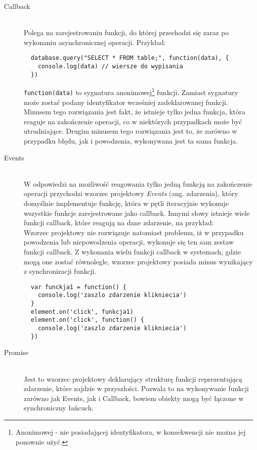 \begin{description}
  \item[Callback] \hfill \\
  Polega na zarejestrowaniu funkcji, do której przechodzi się zaraz po wykonaniu asynchronicznej operacji. Przykład:
  \lstset{language=Octave}
  \begin{lstlisting}
  database.query("SELECT * FROM table;", function(data), {
  	console.log(data) // wiersze do wypisania
  })
  \end{lstlisting}
  \lstinline{function(data)} to sygnatura anonimowej\footnote{Anonimowej - nie posiadającej identyfikatora, w konsekwencji nie można jej ponownie użyć.} funkcji. Zamiast sygnatury może zostać podany identyfikator wcześniej zadeklarowanej funkcji. Minusem tego rozwiązania jest fakt, że istnieje tylko jedna funkcja, która reaguje na zakończenie operacji, co w niektórych przypadkach może być utrudniające. Drugim minusem tego rozwiązania jest to, że zarówno w przypadku błędu, jak i powodzenia, wykonywana jest ta sama funkcja.
  \item[Events] \hfill \\
  W odpowiedzi na możliwość reagowania tylko jedną funkcją na zakończenie operacji przychodzi wzorzec projektowy \emph{Events} (ang. zdarzenia), który domyślnie implementuje funkcję, która w pętli iteracyjnie wykonuje wszystkie funkcje zarejestrowane jako callback. Innymi słowy istnieje wiele funkcji callback, które reagują na dane zdarzenie, na przykład:\\

  

  Wzorzec projektowy nie rozwiązuje natomiast problemu, iż w przypadku powodzenia lub niepowodzenia operacji, wykonuje się ten sam zestaw funkcji callback. Z wykonania wielu funkcji callback w systemach, gdzie mogą one zostać równolegle, wzorzec projektowy posiada minus wynikający z synchronizacji funkcji.
  \lstset{language=Octave}
  \begin{lstlisting}
  var funckja1 = function() {
  	console.log('zaszlo zdarzenie klikniecia')
  }
  element.on('click', funkcja1)
  element.on('click', function() {
  	console.log('zaszlo zdarzenie klikniecia')
  })
  \end{lstlisting}
  \item[Promise] \hfill \\
  Jest to wzorzec projektowy deklarujący strukturę funkcji reprezentującą zdarzenie, które zajdzie w przyszłości. Pozwala to na wykonywanie funkcji zarówno jak Events, jak i Callback, bowiem obiekty mogą być łączone w synchroniczny łańcuch.
\end{description}


